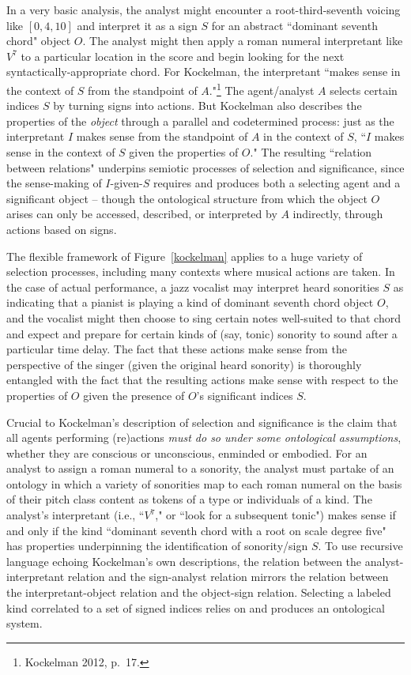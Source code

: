 In a very basic analysis, the analyst might encounter a root-third-seventh voicing like $[0,4,10]$ and interpret it as a sign $S$ for an abstract ``dominant seventh chord" object $O$.  The analyst might then apply a roman numeral interpretant like $V^7$ to a particular location in the score and begin looking for the next syntactically-appropriate chord.  For Kockelman, the interpretant ``makes sense in the context of $S$ from the standpoint of $A$."\footnote{Kockelman 2012, p.\ 17.}  The agent/analyst $A$ selects certain indices $S$ by turning signs into actions.  But Kockelman also describes the properties of the \emph{object} through a parallel and codetermined process: just as the interpretant $I$ makes sense from the standpoint of $A$ in the context of $S$, ``$I$ makes sense in the context of $S$ given the properties of $O$."  The resulting ``relation between relations" underpins semiotic processes of selection and significance, since the sense-making of $I$-given-$S$ requires and produces both a selecting agent and a significant object -- though the ontological structure from which the object $O$ arises can only be accessed, described, or interpreted by $A$ indirectly, through actions based on signs.

The flexible framework of Figure~\ref{kockelman} applies to a huge variety of selection processes, including many contexts where musical actions are taken.  In the case of actual performance, a jazz vocalist may interpret heard sonorities $S$ as indicating that a pianist is playing a kind of dominant seventh chord object $O$, and the vocalist might then choose to sing certain notes well-suited to that chord and expect and prepare for certain kinds of (say, tonic) sonority to sound after a particular time delay.  The fact that these actions make sense from the perspective of the singer (given the original heard sonority) is thoroughly entangled with the fact that the resulting actions make sense with respect to the properties of $O$ given the presence of $O$'s significant indices $S$.

Crucial to Kockelman's description of selection and significance is the claim that all agents performing (re)actions \emph{must do so under some ontological assumptions}, whether they are conscious or unconscious, enminded or embodied.  For an analyst to assign a roman numeral to a sonority, the analyst must partake of an ontology in which a variety of sonorities map to each roman numeral on the basis of their pitch class content as tokens of a type or individuals of a kind.  The analyst's interpretant (i.e., ``$V^7$," or ``look for a subsequent tonic") makes sense if and only if the kind ``dominant seventh chord with a root on scale degree five" has properties underpinning the identification of sonority/sign $S$. To use recursive language echoing Kockelman's own descriptions, the relation between the analyst-interpretant relation and the sign-analyst relation mirrors the relation between the interpretant-object relation and the object-sign relation.  Selecting a labeled kind correlated to a set of signed indices relies on and produces an ontological system.  


